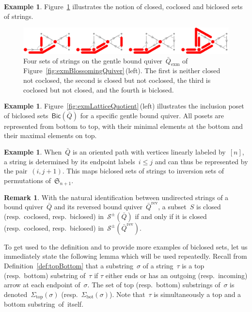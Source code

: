 \documentclass{amsart}
\theoremstyle{definition}
\newtheorem{example}[theorem]{Example}
\newtheorem{remark}[theorem]{Remark}
\newcommand{\fS}{\mathfrak{S}} %
\newcommand{\fref}[1]{Figure~\ref{#1}} %
\newcommand{\ex}{_{\textrm{exm}}} %
\newcommand{\strings}{\mathcal{S}} %
\newcommand{\reversed}[1]{#1^{\mathrm{rev}}} %
\renewcommand{\top}{\mathrm{top}} %
\newcommand{\bottom}{\mathrm{bot}} %
\newcommand{\Bicl}[1]{\mathsf{Bic}(#1)} %
\begin{document}
\begin{example}
\fref{fig:exmBiclosed} illustrates the notion of closed, coclosed and biclosed sets of strings.

\begin{figure}[t]
	\capstart
	\centerline{\includegraphics[scale=.45]{exmBiclosed}}
	\caption{Four sets of strings on the gentle bound quiver~$\bar Q\ex$ of \fref{fig:exmBlossomingQuiver}\,(left). The first is neither closed not coclosed, the second is closed but not coclosed, the third is coclosed but not closed, and the fourth is biclosed.}
	\label{fig:exmBiclosed}
\end{figure}
\end{example}

\begin{example}
\fref{fig:exmLatticeQuotient}\,(left) illustrates the inclusion poset of biclosed sets~$\Bicl{\bar Q}$ for a specific gentle bound quiver.
All posets are represented from bottom to top, with their minimal elements at the bottom and their maximal elements on top.
\end{example}

\begin{example}
When~$\bar Q$ is an oriented path with vertices linearly labeled by~$[n]$, a string is determined by its endpoint labels~$i \le j$ and can thus be represented by the pair~$(i,j+1)$.
This maps biclosed sets of strings to inversion sets of permutations of~$\fS_{n+1}$.
\end{example}

\begin{remark}
\label{rem:reverseBiclosed}
With the natural identification between undirected strings of a bound quiver~$\bar Q$ and its reversed bound quiver~$\reversed{\bar Q}$, a subset~$S$ is closed (resp.~coclosed, resp.~biclosed) in~$\strings^\pm(\bar Q)$ if and only if it is closed (resp.~coclosed, resp.~biclosed) in~$\strings^\pm(\reversed{\bar Q})$.
\end{remark}

\enlargethispage{.3cm}
To get used to the definition and to provide more examples of biclosed sets, let us immediately state the following lemma which will be used repeatedly.
Recall from Definition~\ref{def:topBottom} that a substring~$\sigma$ of a string~$\tau$ is a top (resp.~bottom) substring of~$\tau$ if $\tau$ either ends or has an outgoing (resp.~incoming) arrow at each endpoint of~$\sigma$.
The set of top (resp.~bottom) substrings of~$\sigma$ is denoted~$\Sigma_\top(\sigma)$ (resp.~$\Sigma_\bottom(\sigma)$).
Note that~$\tau$ is simultaneously a top and a bottom \mbox{substring of itself}.
\end{document}
